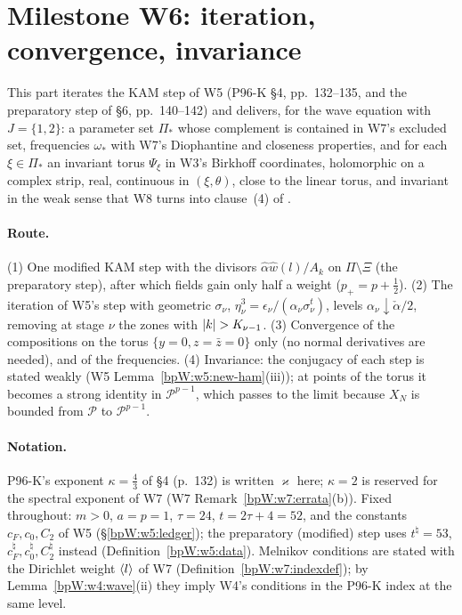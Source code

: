 \section{Milestone W6: iteration, convergence, invariance}\label{bpW:w6}

\providecommand{\Pc}{\mathcal P}
\providecommand{\symp}{\varpi_{\mathcal P}}
\providecommand{\Sm}{\mathcal S}

This part iterates the KAM step of W5 (P96-K \S4, pp.~132--135, and the preparatory step of \S6, pp.~140--142) and
delivers, for the wave equation with $J=\{1,2\}$: a parameter set $\Pi_*$ whose complement is contained in W7's
excluded set, frequencies $\omega_*$ with W7's Diophantine and closeness properties, and for each $\xi\in\Pi_*$ an
invariant torus $\Psi_\xi$ in W3's Birkhoff coordinates, holomorphic on a complex strip, real, continuous in
$(\xi,\theta)$, close to the linear torus, and invariant in the weak sense that W8 turns into clause~(4) of
.

\paragraph{Route.} (1) One modified KAM step with the divisors $\hat\alpha\hat w(l)/A_k$ on $\Pi\setminus\Xi$ (the
preparatory step), after which fields gain only half a weight ($p_+=p+\frac12$). (2) The iteration of W5's step with
geometric $\sigma_\nu$, $\eta_\nu^3=\epsilon_\nu/(\alpha_\nu\sigma_\nu^t)$, levels $\alpha_\nu\downarrow\check\alpha/2$,
removing at stage $\nu$ the zones with $\lvert k\rvert>K_{\nu-1}$. (3) Convergence of the compositions on the torus
$\{y=0,z=\bar z=0\}$ only (no normal derivatives are needed), and of the frequencies. (4) Invariance: the conjugacy of
each step is stated weakly (W5 Lemma~\ref{bpW:w5:new-ham}(iii)); at points of the torus it becomes a strong identity
in $\Pc^{p-1}$, which passes to the limit because $X_N$ is bounded from $\Pc$ to $\Pc^{p-1}$.

\paragraph{Notation.} P96-K's exponent $\kappa=\frac43$ of \S4 (p.~132) is written $\varkappa$ here; $\kappa=2$ is
reserved for the spectral exponent of W7 (W7 Remark~\ref{bpW:w7:errata}(b)). Fixed throughout: $m>0$, $a=p=1$,
$\tau=24$, $t=2\tau+4=52$, and the constants $c_F,c_0,C_2$ of W5 (\S\ref{bpW:w5:ledger}); the preparatory (modified) step uses
$t^\natural=53$, $c^\natural_F,c^\natural_0,C^\natural_2$ instead (Definition~\ref{bpW:w5:data}). Melnikov conditions are
stated with the Dirichlet weight $\langle l\rangle$ of W7 (Definition~\ref{bpW:w7:indexdef}); by Lemma~\ref{bpW:w4:wave}(ii) they
imply W4's conditions in the P96-K index at the same level.

